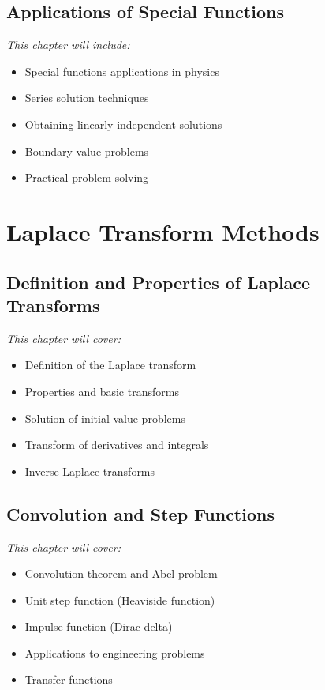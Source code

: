 \documentclass[12pt, letterpaper]{book}
\theoremstyle{problemstyle}
\theoremstyle{solutionstyle}
\begin{document}
\chapter{Applications of Special Functions}
\label{chap:session_10}

\textit{This chapter will include:}
\begin{itemize}
    \item Special functions applications in physics
    \item Series solution techniques
    \item Obtaining linearly independent solutions
    \item Boundary value problems
    \item Practical problem-solving
\end{itemize}

\part{Laplace Transform Methods}
\label{part:laplace_transforms}

\chapter{Definition and Properties of Laplace Transforms}
\label{chap:session_11}

\textit{This chapter will cover:}
\begin{itemize}
    \item Definition of the Laplace transform
    \item Properties and basic transforms
    \item Solution of initial value problems
    \item Transform of derivatives and integrals
    \item Inverse Laplace transforms
\end{itemize}

\chapter{Convolution and Step Functions}
\label{chap:session_12}

\textit{This chapter will cover:}
\begin{itemize}
    \item Convolution theorem and Abel problem
    \item Unit step function (Heaviside function)
    \item Impulse function (Dirac delta)
    \item Applications to engineering problems
    \item Transfer functions
\end{itemize}
\end{document}
